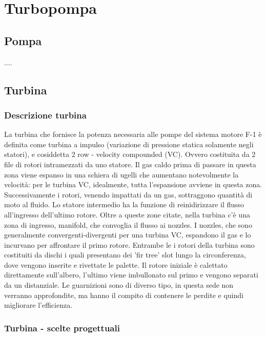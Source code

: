 \section{Turbopompa}
\label{sec:turbopompa}

\subsection{Pompa}
....
\subsection{Turbina}
\subsubsection{Descrizione turbina}

La turbina che fornisce la potenza necessaria alle pompe del sistema motore F-1 è definita come turbina a impulso (variazione di pressione statica solamente negli statori), e cosiddetta 2 row - velocity compounded (VC). Ovvero costituita da 2 file di rotori intramezzati da uno statore. Il gas caldo prima di passare in questa zona viene espanso in una schiera di ugelli che aumentano notevolmente la velocità: per le turbina VC, idealmente, tutta l'espansione avviene in questa zona. Successivamente i rotori, venendo impattati da un gas, sottraggono quantità di moto al fluido. Lo statore intermedio ha la funzione di reinidirizzare il flusso all'ingresso dell'ultimo rotore. Oltre a queste zone citate, nella turbina c'è una zona di ingresso, manifold, che convoglia il flusso ai nozzles. I nozzles, che sono generalmente convergenti-divergenti per una turbina VC, espandono il gas e lo incurvano per affrontare il primo rotore. Entrambe le i rotori della turbina sono costituiti da dischi i quali presentano dei 'fir tree' slot lungo la circonferenza, dove vengono inserite e rivettate le palette. Il rotore iniziale è calettato direttamente sull'albero, l'ultimo viene imbullonato sul primo e vengono separati da un distanziale. Le guarnizioni sono di diverso tipo, in questa sede non verranno approfondite, ma hanno il compito di contenere le perdite e quindi migliorare l'efficienza. 

\subsubsection{Turbina - scelte progettuali}

